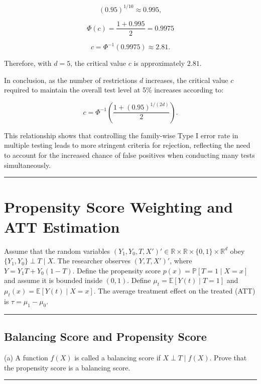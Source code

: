 \documentclass{article}
\newenvironment{colorparagraph}[1]{\par\color{#1}}{\par}
\begin{document}
\[
(0.95)^{1/10} \approx 0.995,
\]

\[
\Phi(c) = \frac{1 + 0.995}{2} = 0.9975
\]

\[
c = \Phi^{-1}(0.9975) \approx 2.81.
\]

Therefore, with \( d = 5 \), the critical value \( c \) is approximately \( 2.81 \).

In conclusion, as the number of restrictions \( d \) increases, the critical value \( c \) required to maintain the overall test level at 5\% increases according to:

\[
c = \Phi^{-1}\left( \frac{1 + (0.95)^{1/(2d)}}{2} \right).
\]

This relationship shows that controlling the family-wise Type I error rate in multiple testing leads to more stringent criteria for rejection, reflecting the need to account for the increased chance of false positives when conducting many tests simultaneously.

\newpage

\begin{colorparagraph}{questioncolor}
\rule{\textwidth}{0.5pt}

\label{q2}\section{Propensity Score Weighting and ATT Estimation}

Assume that the random variables \( (Y_1, Y_0, T, X')' \in \mathbb{R} \times \mathbb{R} \times \{0, 1\} \times \mathbb{R}^d \) obey \( \{Y_1, Y_0\} \perp T \mid X \). The researcher observes \( (Y, T, X')' \), where \( Y = Y_1 T + Y_0(1 - T) \). Define the propensity score \( p(x) = \mathbb{P}[T = 1 \mid X = x] \) and assume it is bounded inside \( (0,1) \). Define \( \mu_t = \mathbb{E}[Y(t) \mid T = 1] \) and \( \mu_t(x) = \mathbb{E}[Y(t) \mid X = x] \). The average treatment effect on the treated (ATT) is \( \tau = \mu_1 - \mu_0 \).

\rule{\textwidth}{0.5pt}
\end{colorparagraph}

\begin{colorparagraph}{questioncolor}
\label{q2a}\subsection{Balancing Score and Propensity Score}
(a) A function \( f(X) \) is called a balancing score if \( X \perp T \mid f(X) \). Prove that the propensity score is a balancing score.

\rule{\textwidth}{0.5pt}
\end{colorparagraph}
\end{document}
